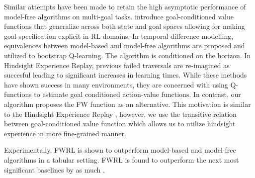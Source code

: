 Similar attempts have been made to retain the high asymptotic
performance of model-free algorithms on multi-goal tasks.
\citet{schaul2015universal} introduce goal-conditioned value functions
that generalize across both state and goal spaces allowing for
making goal-specification explicit in RL domains. In temporal difference
modelling, equivalences between model-based and model-free algorithms
are proposed and utilized to bootstrap Q-learning. The algorithm is
conditioned on the horizon. In Hindsight Experience Replay, previous
failed traversals are re-imagined as succesful leading to significant
increases in learning times. While these methods have shown success in
many environments, they are concerned with using Q-functions to estimate
goal conditioned action-value functions. In contrast, our algorithm
proposes the FW function as an alternative. This motivation is
similar to the Hindsight Experience Replay \cite{anderson2017vision}, however,
we use the transitive relation between goal-conditioned value function which
allows us to utilize hindsight experience in more fine-grained manner.

Experimentally, FWRL is shown to outperform model-based and model-free
algorithms in a tabular setting. FWRL is found to outperform the next
most significant baselines by as much .





